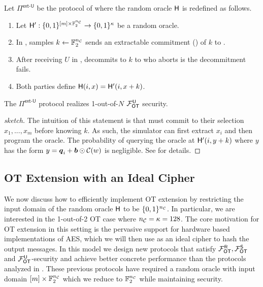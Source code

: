 \begin{definition}\label{def:ext_Su_U}
	Let $\Pi^{\textsf{ext-U}}$ be the protocol of  where the random oracle $\mathsf{H}$ is redefined as follows. 
	\begin{enumerate}
		\item Let $\mathsf{H}':\{0,1\}^{[m]\times \mathbb{F}^{{n_\mathcal{C}}}_2}\rightarrow\{0,1\}^\kappa$ be a random oracle.
		\item In , \send samples $k\gets\mathbb{F}^{{n_\mathcal{C}}}_2$ sends an extractable commitment () of $k$ to \rec. 
		\item After receiving $U$ in , \send decommits to $k$ to \rec who aborts is the decommitment fails.
		\item Both parties define $\mathsf{H}(i,x)=\mathsf{H}'(i,x+k)$.
	\end{enumerate}
\end{definition}
\begin{lemma}
	The $\Pi^{\textsf{ext-U}}$ protocol realizes 1-out-of-$N$ $\mathcal{F}_{\mathsf{OT}}^\mathsf{U}$ security.
\end{lemma}
%
\iffullversion

\else
\begin{proof}[sketch]
	The intuition of this statement is that \rec must commit to their selection $x_1,...,x_m$ before knowing $k$. As such, the simulator can first extract $x_i$ and then program the oracle. The probability of \rec querying the oracle at $\mathsf{H}'(i,y+k)$ where $y$ has the form $y=\boldsymbol{q}_i + \boldsymbol{b} \odot\mathcal{C}(w)$ is negligible. See  for details.
\end{proof}
\fi


\subsection{OT Extension with an Ideal Cipher}\label{sec:extIdealCipher}
We now discuss how to efficiently implement OT extension by restricting the input domain of the random oracle $\mathsf{H}$ to be $\{0,1\}^{{n_\mathcal{C}}}$. In particular, we are interested in the 1-out-of-2 OT case where ${n_\mathcal{C}}=\kappa=128$. The core motivation for OT extension in this setting is the pervasive support for hardware based implementations of AES, which we will then use as an ideal cipher to hash the output messages. In this model we design new protocols that satisfy $\mathcal{F}_{\mathsf{OT}}^\mathsf{R}, \mathcal{F}_{\mathsf{OT}}^\mathsf{S}$ and $\mathcal{F}_{\mathsf{OT}}^\mathsf{U}$-security and achieve better concrete performance than the protocols analyzed in  . These previous protocols have required a random oracle with input domain $[m]\times \mathbb{F}^{{n_\mathcal{C}}}_2$ which we reduce to $\mathbb{F}^{{n_\mathcal{C}}}_2$ while maintaining security. 


